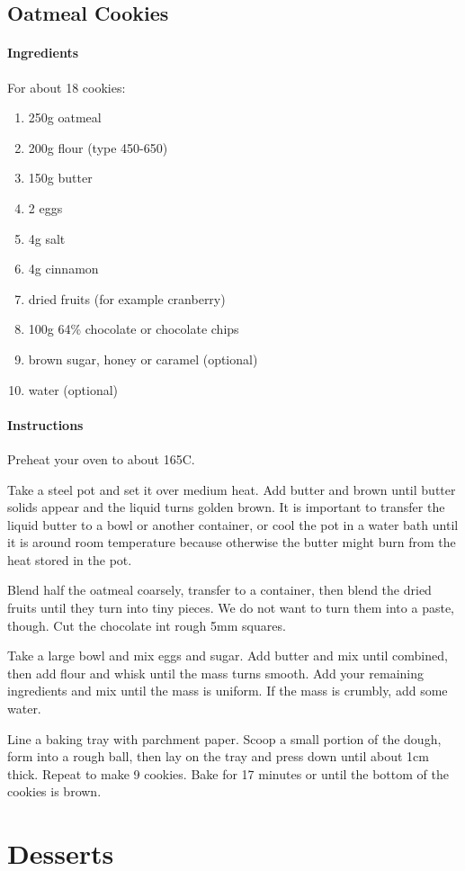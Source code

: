 \documentclass[11pt]{report}
\newcommand{\header}[1]{\subsubsection*{#1}}
\begin{document}
\section{Oatmeal Cookies}
\header{Ingredients}
For about 18 cookies:
\begin{enumerate}
  \item 250g oatmeal
  \item 200g flour (type 450-650)
  \item 150g butter
  \item 2 eggs
  \item 4g salt
  \item 4g cinnamon
  \item dried fruits (for example cranberry)
  \item 100g 64\% chocolate or chocolate chips
  \item brown sugar, honey or caramel (optional)
  \item water (optional)
\end{enumerate}

\header{Instructions}
Preheat your oven to about 165C.

Take a steel pot and set it over medium heat. Add butter and brown until butter
solids appear and the liquid turns golden brown. It is important to transfer
the liquid butter to a bowl or another container, or cool the pot in a water
bath until it is around room temperature because otherwise the butter might
burn from the heat stored in the pot.

Blend half the oatmeal coarsely, transfer to a container, then blend the dried
fruits until they turn into tiny pieces. We do not want to turn them into a
paste, though. Cut the chocolate int rough 5mm squares.

Take a large bowl and mix eggs and sugar. Add butter and mix until combined,
then add flour and whisk until the mass turns smooth. Add your remaining
ingredients and mix until the mass is uniform. If the mass is crumbly, add some
water.

Line a baking tray with parchment paper. Scoop a small portion of the dough,
form into a rough ball, then lay on the tray and press down until about 1cm
thick. Repeat to make 9 cookies. Bake for 17 minutes or until the bottom of the
cookies is brown.

\chapter{Desserts}
\end{document}
